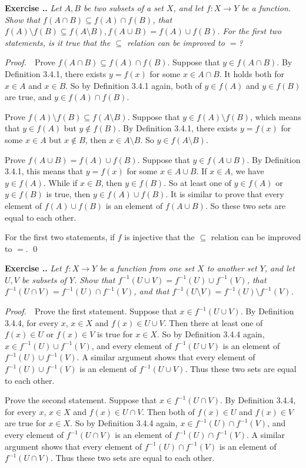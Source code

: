 \documentclass{book}
\newcommand{\pff}{\vspace{.25em}\noindent\emph{Proof.}~~}
\newcounter{Exercise}[section]
\renewcommand{\theExercise}{\thesection.\arabic{Exercise}.}
\newcommand{\new}{\vspace{1.5em}\noindent\textbf{{Exercise \stepcounter{Exercise}\textbf{\theExercise}}} }
\begin{document}
\new\emph{Let $A, B$ be two subsets of a set $X$, and let $f:X\to Y$ be a function. Show that $f(A\cap B)\subseteq f(A)\cap f(B)$, that $f(A)\setminus f(B)\subseteq f(A\setminus B), f(A\cup B)=f(A)\cup f(B)$. For the first two statements, is it true that the $\subseteq$ relation can be improved to $=$?}

\pff Prove $f(A\cap B)\subseteq f(A)\cap f(B)$. Suppose that $y\in f(A\cap B)$. By Definition 3.4.1, there exists $y=f(x)$ for some $x\in A\cap B$. It holds both for $x\in A$ and $x\in B$. So by Definition 3.4.1 again, both of $y\in f(A)$ and $y\in f(B)$ are true, and $y\in f(A)\cap f(B)$.

Prove $f(A)\setminus f(B)\subseteq f(A\setminus B)$. Suppose that $y\in f(A)\setminus f(B)$, which means that $y\in f(A)$ but $y\notin f(B)$. By Definition 3.4.1, there exists $y=f(x)$ for some $x\in A$ but $x\notin B$, then $x\in A\setminus B$. So $y\in f(A\setminus B)$.

Prove $f(A\cup B)=f(A)\cup f(B)$. Suppose that $y\in f(A\cup B)$. By Definition 3.4.1, this means that $y=f(x)$ for some $x\in A\cup B$. If $x\in A$, we have $y\in f(A)$. While if $x\in B$, then $y\in f(B)$. So at least one of $y\in f(A)$ or $y\in f(B)$ is true, then $y\in f(A)\cup f(B)$. It is similar to prove that every element of $f(A)\cup f(B)$ is an element of $f(A\cup B)$. So these two sets are equal to each other.

For the first two statements, if $f$ is injective that the $\subseteq$ relation can be improved to $=$. \qed

\new\emph{Let $f:X\to Y$ be a function from one set $X$ to another set $Y$, and let $U,V$ be subsets of $Y$. Show that $f^{-1}(U\cup V)=f^{-1}(U)\cup f^{-1}(V)$, that $f^{-1}(U\cap V)=f^{-1}(U)\cap f^{-1}(V)$, and that $f^{-1}(U\setminus V)=f^{-1}(U)\setminus f^{-1}(V)$.}

\pff Prove the first statement. Suppose that $x\in f^{-1}(U\cup V)$. By Definition 3.4.4, for every $x$, $x\in X$ and $f(x)\in U\cup V$. Then there at least one of $f(x)\in U$ or $f(x)\in V$ is true for $x\in X$. So by Definition 3.4.4 again, $x\in f^{-1}(U)\cup f^{-1}(V)$, and every element of $f^{-1}(U\cup V)$ is an element of $f^{-1}(U)\cup f^{-1}(V)$. A similar argument shows that every element of $f^{-1}(U)\cup f^{-1}(V)$ is an element of $f^{-1}(U\cup V)$. Thus these two sets are equal to each other.

Prove the second statement. Suppose that $x\in f^{-1}(U\cap V)$. By Definition 3.4.4, for every $x$, $x\in X$ and $f(x)\in U\cap V$. Then both of $f(x)\in U$ and $f(x)\in V$ are true for $x\in X$. So by Definition 3.4.4 again, $x\in f^{-1}(U)\cap f^{-1}(V)$, and every element of $f^{-1}(U\cap V)$ is an element of $f^{-1}(U)\cap f^{-1}(V)$. A similar argument shows that every element of $f^{-1}(U)\cap f^{-1}(V)$ is an element of $f^{-1}(U\cap V)$. Thus these two sets are equal to each other.
\end{document}
